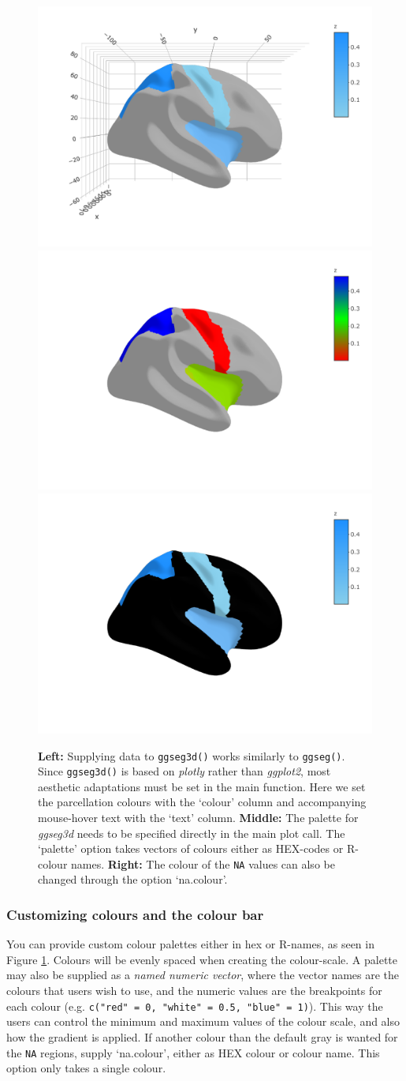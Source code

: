 \documentclass[fleqn,10pt]{wlpeerj} %
\begin{document}
\begin{figure}[H]
\includegraphics[width=0.3\linewidth]{msc_ggseg_files/figure-latex/figure8l} \includegraphics[width=0.3\linewidth]{msc_ggseg_files/figure-latex/figure8m} \includegraphics[width=0.3\linewidth]{msc_ggseg_files/figure-latex/figure8r} \caption{\textbf{Left:} Supplying data to \texttt{ggseg3d()} works similarly to \texttt{ggseg()}. Since \texttt{ggseg3d()} is based on \emph{plotly} rather than \emph{ggplot2}, most aesthetic adaptations must be set in the main function. Here we set the parcellation colours with the `colour' column and accompanying mouse-hover text with the `text' column. \textbf{Middle:} The palette for \emph{ggseg3d} needs to be specified directly in the main plot call. The `palette' option takes vectors of colours either as HEX-codes or R-colour names. \textbf{Right:} The colour of the \texttt{NA} values can also be changed through the option `na.colour'.}\label{fig:figure8}
\end{figure}

\hypertarget{customizing-colours-and-the-colour-bar}{%
\subsubsection{Customizing colours and the colour bar}\label{customizing-colours-and-the-colour-bar}}

You can provide custom colour palettes either in hex or R-names, as seen in Figure \ref{fig:figure8}.
Colours will be evenly spaced when creating the colour-scale.
A palette may also be supplied as a \emph{named numeric vector}, where the vector names are the colours that users wish to use, and the numeric values are the breakpoints for each colour (e.g. \texttt{c("red"\ =\ 0,\ "white"\ =\ 0.5,\ "blue"\ =\ 1)}).
This way the users can control the minimum and maximum values of the colour scale, and also how the gradient is applied.
If another colour than the default gray is wanted for the \texttt{NA} regions, supply `na.colour', either as HEX colour or colour name.
This option only takes a single colour.
\end{document}
